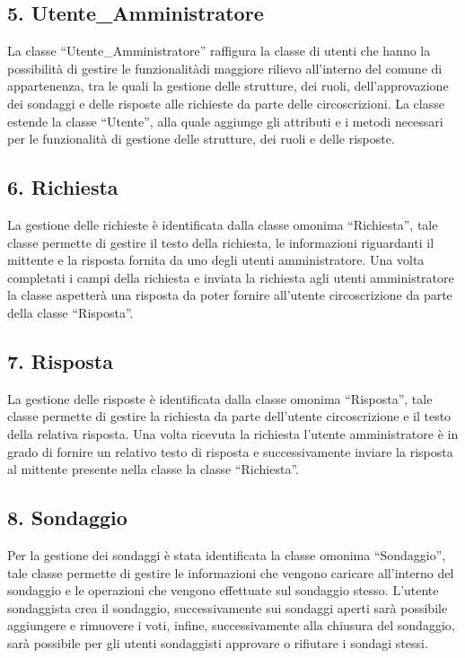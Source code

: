     \subsection*{5. Utente\_Amministratore}
        La classe ``Utente\_Amministratore'' raffigura la classe di utenti che hanno la possibilità di gestire le funzionalitàdi maggiore rilievo all'interno del comune di appartenenza, tra le quali la gestione delle strutture, dei ruoli, dell'approvazione dei sondaggi e delle risposte alle richieste da parte delle circoscrizioni. La classe estende la classe ``Utente'', alla quale aggiunge gli attributi e i metodi necessari per le funzionalità di gestione delle strutture, dei ruoli e delle risposte.

    \subsection*{6. Richiesta}
        La gestione delle richieste è identificata dalla classe omonima ``Richiesta'', tale classe permette di gestire il testo della richiesta, le informazioni riguardanti il mittente e la risposta fornita da uno degli utenti amministratore. Una volta completati i campi della richiesta e inviata la richiesta agli utenti amministratore la classe aspetterà una risposta da poter fornire all'utente circoscrizione da parte della classe ``Risposta''.
    
    \subsection*{7. Risposta}
        La gestione delle risposte è identificata dalla classe omonima ``Risposta'', tale classe permette di gestire la richiesta da parte dell'utente circoscrizione e il testo della relativa risposta. Una volta ricevuta la richiesta l'utente amministratore è in grado di fornire un relativo testo di risposta e successivamente inviare la risposta al mittente presente nella classe la classe ``Richiesta''.

    \subsection*{8. Sondaggio}
        Per la gestione dei sondaggi è stata identificata la classe omonima ``Sondaggio'', tale classe permette di gestire le informazioni che vengono caricare all'interno del sondaggio e le operazioni che vengono effettuate sul sondaggio stesso. L'utente sondaggista crea il sondaggio, successivamente sui sondaggi aperti sarà possibile aggiungere e rimuovere i voti, infine, successivamente alla chiusura del sondaggio, sarà possibile per gli utenti sondaggisti approvare o rifiutare i sondagi stessi.
    

